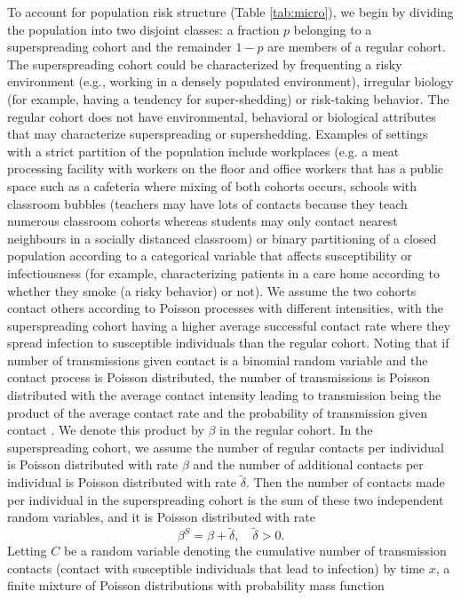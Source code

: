 \documentclass{imammb}
\numberwithin{equation}{section}
\begin{document}
To account for population risk structure (Table \ref{tab:micro}), we begin by dividing the population into two disjoint classes: a fraction $p$ belonging to a superspreading cohort and the remainder $1-p$ are members of a regular cohort. The superspreading cohort could be characterized by frequenting a risky environment (e.g., working in a densely populated environment), irregular biology (for example, having a tendency for super-shedding) or risk-taking behavior. The regular cohort does not have environmental, behavioral or biological attributes that may characterize superspreading or supershedding. Examples of settings with a strict partition of the population  include workplaces (e.g. a meat processing facility with workers on the floor and office workers that has a public space such as a cafeteria where mixing of both cohorts occurs, schools with classroom bubbles (teachers may have lots of contacts because they teach numerous classroom cohorts whereas students may only contact nearest neighbours in a socially distanced classroom) or binary partitioning of a closed population according to a categorical variable that affects susceptibility or infectiousness (for example, characterizing patients in a care home according to whether they smoke (a risky behavior) or not). We assume the two cohorts contact others according to Poisson processes with different intensities, with the superspreading cohort having a higher average successful contact rate where they spread infection to susceptible individuals than the regular cohort. Noting that if number of transmissions given contact is a binomial random variable and the contact process is Poisson distributed, the number of transmissions is Poisson distributed with the average contact intensity leading to transmission being the product of the average contact rate and the probability of transmission given contact \citep{Diekmann2013-zu}. We denote this product by $\beta$ in the regular cohort. In the superspreading cohort, we assume the number of regular contacts per individual is Poisson distributed with rate $\beta$ and the number of additional contacts per individual is Poisson distributed with rate $\tilde{\delta}$. Then the number of contacts made per individual in the superspreading cohort is the sum of these two independent random variables, and it is Poisson distributed with rate
\begin{equation}\label{eqn:R0Adel}
   \beta^S = \beta +\tilde{\delta}, \quad \tilde{\delta} >0.  
\end{equation}
Letting $C$ be a random variable denoting the cumulative number of transmission contacts (contact with susceptible individuals that lead to infection) by time $x$,  a finite mixture of Poisson distributions with probability mass function %
\end{document}
